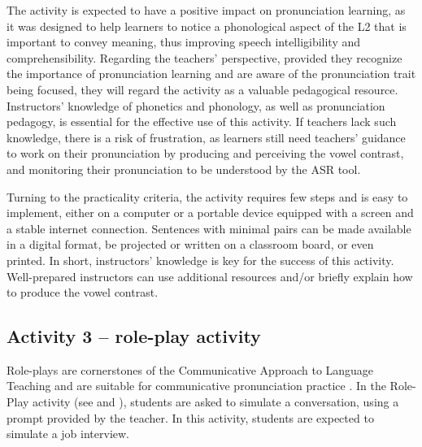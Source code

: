 \documentclass[english]{textolivre}
\begin{document}
The activity is expected to have a positive impact on pronunciation
learning, as it was designed to help learners to notice a phonological
aspect of the L2 that is important to convey meaning, thus improving
speech intelligibility and comprehensibility. Regarding the teachers'
perspective, provided they recognize the importance of pronunciation
learning and are aware of the pronunciation trait being focused, they
will regard the activity as a valuable pedagogical resource.
Instructors' knowledge of phonetics and phonology, as well as
pronunciation pedagogy, is essential for the effective use of this
activity. If teachers lack such knowledge, there is a risk of
frustration, as learners still need teachers' guidance to work on their
pronunciation by producing and perceiving the vowel contrast, and
monitoring their pronunciation to be understood by the ASR tool.

Turning to the practicality criteria, the activity requires few steps
and is easy to implement, either on a computer or a portable device
equipped with a screen and a stable internet connection. Sentences with
minimal pairs can be made available in a digital format, be projected or
written on a classroom board, or even printed. In short, instructors'
knowledge is key for the success of this activity. Well-prepared
instructors can use additional resources and/or briefly explain how to
produce the vowel contrast.

\subsection{ Activity 3 -- role-play
activity}\label{sec-activity-3}


Role-plays are cornerstones of the Communicative Approach to Language
Teaching \cite{littlewood2011} and are suitable for communicative
pronunciation practice \cite{celcemurcia2010}. In the Role-Play activity
(see  and ), students are asked to simulate a
conversation, using a prompt provided by the teacher. In this activity,
students are expected to simulate a job interview.
\end{document}
